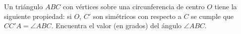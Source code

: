Un triángulo $ABC$ con vértices sobre una circunferencia de centro $O$ tiene la siguiente propiedad: si $O$, $C'$ son simétricos con respecto a $C$ se cumple que \angle $CC'A = \angle ABC$. Encuentra el valor (en grados) del ángulo $\angle ABC$.